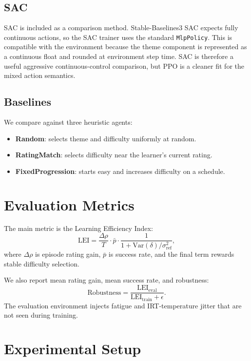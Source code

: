 \documentclass[10pt,twocolumn]{article}
\begin{document}
\subsection{SAC}

SAC is included as a comparison method. Stable-Baselines3 SAC expects fully continuous
actions, so the SAC trainer uses the standard \texttt{MlpPolicy}. This is compatible
with the environment because the theme component is represented as a continuous float
and rounded at environment step time. SAC is therefore a useful aggressive
continuous-control comparison, but PPO is a cleaner fit for the mixed action semantics.

\subsection{Baselines}

We compare against three heuristic agents:

\begin{itemize}[leftmargin=*,itemsep=1pt,topsep=2pt]
    \item \textbf{Random}: selects theme and difficulty uniformly at random.
    \item \textbf{RatingMatch}: selects difficulty near the learner's current rating.
    \item \textbf{FixedProgression}: starts easy and increases difficulty on a schedule.
\end{itemize}

\section{Evaluation Metrics}

The main metric is the Learning Efficiency Index:
\[
\text{LEI}=
\frac{\Delta \rho}{T}\cdot \bar{p}\cdot
\frac{1}{1+\text{Var}(\delta)/\sigma^2_{\text{ref}}},
\]
where $\Delta\rho$ is episode rating gain, $\bar{p}$ is success rate, and the final
term rewards stable difficulty selection.

We also report mean rating gain, mean success rate, and robustness:
\[
\text{Robustness}=\frac{\text{LEI}_{\text{eval}}}{\text{LEI}_{\text{train}}+\epsilon}.
\]
The evaluation environment injects fatigue and IRT-temperature jitter that are not
seen during training.

\section{Experimental Setup}
\end{document}
